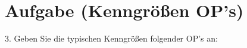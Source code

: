 \section{Aufgabe (Kenngrößen OP's)}%
\label{sec:aufgabe_3}

3. Geben Sie die typischen Kenngrößen folgender OP's an:
